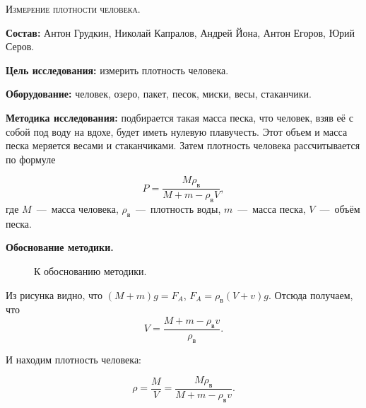 \begin{center}
  \textsc{Измерение плотности человека. }
\end{center}

\textbf{Состав:} Антон Грудкин, Николай Капралов, Андрей Йона, Антон
Егоров, Юрий Серов.

\textbf{Цель исследования:} измерить плотность человека. 

\textbf{Оборудование:} человек, озеро, пакет, песок, миски, весы, стаканчики.

\textbf{Методика исследования:} подбирается такая масса песка, что
человек, взяв её с собой под воду на вдохе, будет иметь нулевую
плавучесть. Этот объем и масса песка меряется весами и
стаканчиками. Затем плотность человека рассчитывается по формуле

\begin{equation}
  \label{eq:bz09_01}
  P = \frac{M \rho_{\text{в}}}{M + m - \rho_{\text{в}} V},
\end{equation}
где $M$~---~масса человека, $\rho_{\text{в}}$~---~плотность воды,
$m$~---~масса песка, $V$~---~объём песка. 

\begin{center}
  \textbf{Обоснование методики.}  
\end{center}

\begin{figure}[h]
  \centering
  \caption{К обоснованию методики.}
  \label{fig:bz09_density}
\end{figure}

Из рисунка видно, что $(M+m)g=F_A$, $F_A = \rho_{\text{в}} (V+v)
g$. Отсюда получаем, что
\begin{equation}
  \label{eq:bz09_1}
  V= \frac{M+m-\rho_{\text{в}} v} {\rho_{\text{в}}}.
\end{equation}

И находим плотность человека: 

\begin{equation}
  \label{eq:bz09_2}
  \rho = \frac{M}{V} = \frac{M \rho_{\text{в}}} {M+m-\rho_{\text{в}} v}.
\end{equation}

